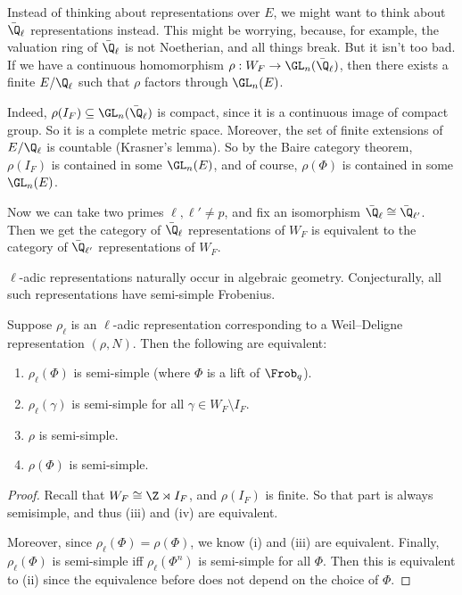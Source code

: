 \documentclass[a4paper]{article}
\begin{document}
Instead of thinking about representations over $E$, we might want to think about $\bar{\Q}_\ell$ representations instead. This might be worrying, because, for example, the valuation ring of $\bar{\Q}_\ell$ is not Noetherian, and all things break. But it isn't too bad. If we have a continuous homomorphism $\rho: W_F \to \GL_n(\bar{\Q}_\ell)$, then there exists a finite $E/\Q_\ell$ such that $\rho$ factors through $\GL_n(E)$.

Indeed, $\rho(I_F) \subseteq \GL_n(\bar{\Q}_\ell)$ is compact, since it is a continuous image of compact group.  So it is a complete metric space. Moreover, the set of finite extensions of $E/\Q_\ell$ is countable (Krasner's lemma). So by the Baire category theorem, $\rho(I_F)$ is contained in some $\GL_n(E)$, and of course, $\rho(\Phi)$ is contained in some $\GL_n(E)$.

Now we can take two primes $\ell, \ell' \not= p$, and fix an isomorphism $\bar{\Q}_\ell \cong \bar{\Q}_{\ell'}$. Then we get the category of $\bar{\Q}_\ell$ representations of $W_F$ is equivalent to the category of $\bar{\Q}_{\ell'}$ representations of $W_F$.

$\ell$-adic representations naturally occur in algebraic geometry. Conjecturally, all such representations have semi-simple Frobenius.
\begin{prop}
  Suppose $\rho_\ell$ is an $\ell$-adic representation corresponding to a Weil--Deligne representation $(\rho, N)$. Then the following are equivalent:
  \begin{enumerate}
    \item $\rho_\ell(\Phi)$ is semi-simple (where $\Phi$ is a lift of $\Frob_q$).
    \item $\rho_\ell(\gamma)$ is semi-simple for all $\gamma \in W_F \setminus I_F$.
    \item $\rho$ is semi-simple.
    \item $\rho(\Phi)$ is semi-simple.
  \end{enumerate}
\end{prop}
\begin{proof}
  Recall that $W_F \cong \Z \rtimes I_F$, and $\rho(I_F)$ is finite. So that part is always semisimple, and thus (iii) and (iv) are equivalent. %

  Moreover, since $\rho_\ell(\Phi) = \rho(\Phi)$, we know (i) and (iii) are equivalent. Finally, $\rho_\ell(\Phi)$ is semi-simple iff $\rho_\ell(\Phi^n)$ is semi-simple for all $\Phi$. Then this is equivalent to (ii) since the equivalence before does not depend on the choice of $\Phi$.
\end{proof}
\end{document}
